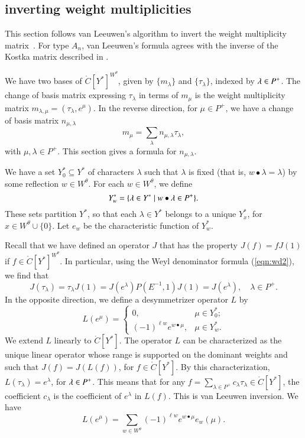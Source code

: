 \subsection{inverting weight multiplicities}

This section follows van Leeuwen's algorithm to invert the weight
multiplicity matrix~\cite{vanleeuwen}.  For type $A_n$, van Leeuwen's
formula agrees with the inverse of the Kostka matrix described in
\cite{duan}.

We have two bases of $\ring{C}[Y^*]^{W^\theta}$, given by
$\{m_\lambda\}$ and $\{\tau_\lambda\}$, indexed by $\lambda\in P^+$.
The change of basis matrix expressing $\tau_\lambda$ in terms of
$m_\mu$ is the weight multiplicity matrix $m_{\lambda,\mu} =
(\tau_\lambda,e^\mu)$.  In the reverse direction, for $\mu\in P^+$, we
have a change of basis matrix $n_{\mu,\lambda}$
\begin{equation}\label{eqn:n}
m_\mu = \sum_{\lambda} n_{\mu,\lambda} \tau_\lambda,
\end{equation}
with $\mu,\lambda\in P^+$.
This section gives a formula for $n_{\mu,\lambda}$.  

We have a set $Y^*_0\subseteq Y^*$ of characters $\lambda$ such that
$\lambda$ is fixed (that is, $w\bullet \lambda = \lambda$) by some
reflection $w\in W^\theta$.  For each $w\in W^\theta$, we define
\begin{equation}
Y^*_w = \{\lambda\in Y^*\mid w\bullet \lambda \in P^+\}.
\end{equation}
These sets partition $Y^*$, so that each $\lambda\in Y^*$ belongs to a
unique $Y^*_x$, for $x\in W^\theta\cup\{0\}$.  Let $e_w$ be the
characteristic function of $Y^*_w$.

Recall that we have defined an operator $J$ that has the property
$J(f) = f J(1)$ if $f\in \ring{C}[Y^*]^{W^\theta}$.  In particular,
using the Weyl denominator formula (\ref{eqn:wd2}), we find that
\begin{equation}
 J(\tau_\lambda) = \tau_\lambda J(1) 
= J(e^\lambda) P(E^{-1},1) J(1) = J(e^\lambda),\quad  \lambda\in P^+.
\end{equation}
In the opposite direction, we define a desymmetrizer operator $L$ by
\[
L(e^\mu) = \begin{cases}
0,& \mu\in Y^*_0;\\
(-1)^{\ell{w}} e^{w\bullet \mu},& \mu\in Y^*_w.
\end{cases}
\]
We extend $L$ linearly to $\ring{C}[Y^*]$.  The operator $L$ can be
characterized as the unique linear operator whose range is supported
on the dominant weights and such that $J(f) = J(L(f))$, for $f\in
\ring{C}[Y^*]$.  By this characterization, $L(\tau_\lambda) =
e^\lambda$, for $\lambda\in P^+$.  This means that for any $f =
\sum_{\lambda\in P^+} c_\lambda \tau_\lambda \in \ring{C}[Y^*]$, the
coefficient $c_\lambda$ is the coefficient of $e^\lambda$ in $L(f)$.
This is van Leeuwen inversion.
We have
\[
L(e^\mu) = \sum_{w\in W^\theta} (-1)^{\ell w} e^{w\bullet \mu} e_w(\mu).
\]

